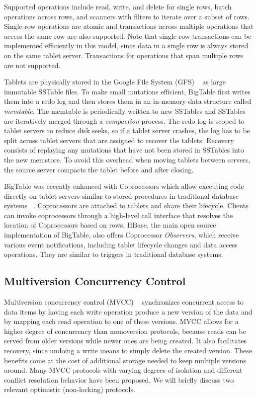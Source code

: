 \documentclass[10pt,final,journal]{IEEEtran}
\begin{document}
Supported operations include read, write, and delete for single rows, batch operations across rows, and scanners with filters to iterate over a subset of rows. Single-row operations are atomic and transactions across multiple operations that access the same row are also supported. Note that single-row transactions can be implemented efficiently in this model, since data in a single row is always stored on the same tablet server. Transactions for operations that span multiple rows are not supported.

Tablets are physically stored in the Google File System (GFS) ~\cite{Ghemawat:2003:GFS:1165389.945450} as large immutable SSTable files. To make small mutations efficient, BigTable first writes them into a redo log and then stores them in an in-memory data structure called \emph{memtable}. The memtable is periodically written to new SSTables and SSTables are iteratively merged through a \emph{compaction} process. The redo log is scoped to tablet servers to reduce disk seeks, so if a tablet server crashes, the log has to be split across tablet servers that are assigned to recover the tablets. Recovery consists of replaying any mutations that have not been stored in SSTables into the new memstore. To avoid this overhead when moving tablets between servers, the source server compacts the tablet before and after closing.

BigTable was recently enhanced with Coprocessors which allow executing code directly on tablet servers similar to stored procedures in traditional database systems ~\cite{Dean:2009}. Coprocessors are attached to tablets and share their lifecycle. Clients can invoke coprocessors through a high-level call interface that resolves the location of Coprocessors based on rows. HBase, the main open source implementation of BigTable, also offers Coprocessor \emph{Observers}, which receive various event notifications, including tablet lifecycle changes and data access operations. They are similar to triggers in traditional database systems.

\subsection{Multiversion Concurrency Control}
Multiversion concurrency control (MVCC) ~\cite{Bernstein:1983:MCC:319996.319998} synchronizes concurrent access to data items by having each write operation produce a new version of the data and by mapping each read operation to one of these versions. MVCC allows for a higher degree of concurrency than monoversion protocols, because reads can be served from older versions while newer ones are being created. It also facilitates recovery, since undoing a write means to simply delete the created version. These benefits come at the cost of additional storage needed to keep multiple versions around. Many MVCC protocols with varying degrees of isolation and different conflict resolution behavior have been proposed. We will briefly discuss two relevant optimistic (non-locking) protocols.
\end{document}
